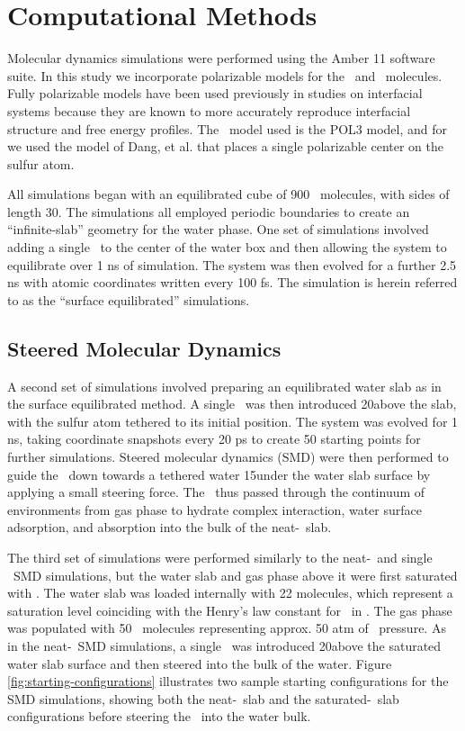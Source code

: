 \section{Computational Methods}

Molecular dynamics simulations were performed using the Amber 11 software suite.\cite{Case2010} In this study we incorporate polarizable models for the \wat~and \suldiox~molecules. Fully polarizable models have been used previously in studies on interfacial systems because they are known to more accurately reproduce interfacial structure and free energy profiles.\cite{Wick2007,Rivera2006,Dang1998} The \wat~model used is the POL3 model,\cite{Caldwell1995} and for \suldiox we used the model of Dang, et al. that places a single polarizable center on the sulfur atom.\cite{Baer2010}

All simulations began with an equilibrated cube of 900 \wat~molecules, with sides of length 30\angs. The simulations all employed periodic boundaries to create an ``infinite-slab'' geometry for the water phase. One set of simulations involved adding a single \suldiox~to the center of the water box and then allowing the system to equilibrate over 1 ns of simulation. The system was then evolved for a further 2.5 ns with atomic coordinates written every 100 fs. The simulation is herein referred to as the ``surface equilibrated'' simulations. 

\subsection{Steered Molecular Dynamics}

A second set of simulations involved preparing an equilibrated water slab as in the surface equilibrated method. A single \suldiox~was then introduced 20\angs above the slab, with the sulfur atom tethered to its initial position. The system was evolved for 1 ns, taking coordinate snapshots every 20 ps to create 50 starting points for further simulations. Steered molecular dynamics (SMD) were then performed to guide the \suldiox~down towards a tethered water 15\angs under the water slab surface by applying a small steering force.\cite{Isralewitz2001} The \suldiox~thus passed through the continuum of environments from gas phase to hydrate complex interaction, water surface adsorption, and absorption into the bulk of the neat-\wat~slab.

The third set of simulations were performed similarly to the neat-\wat~and single \suldiox~SMD simulations, but the water slab and gas phase above it were first saturated with \suldiox. The water slab was loaded internally with 22 \suldiox molecules, which represent a saturation level coinciding with the Henry's law constant for \suldiox~in \wat. The gas phase was populated with 50 \suldiox~molecules representing approx. 50 atm of \suldiox~pressure. As in the neat-\wat~SMD simulations, a single \suldiox~was introduced 20\angs above the saturated water slab surface and then steered into the bulk of the water. Figure \ref{fig:starting-configurations} illustrates two sample starting configurations for the SMD simulations, showing both the neat-\wat~slab and the saturated-\wat~slab configurations before steering the \suldiox~into the water bulk.


